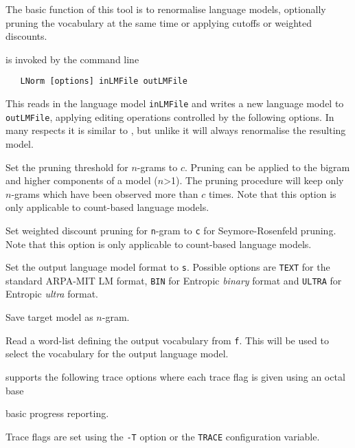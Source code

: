 %
%

\newpage
{}


The basic function of this tool is to renormalise language models,
optionally pruning the vocabulary at the same time or applying cutoffs
or weighted discounts.


 is invoked by the command line
\begin{verbatim}
   LNorm [options] inLMFile outLMFile
\end{verbatim}
This reads in the language model {\tt inLMFile} and writes a new
language model to {\tt outLMFile}, applying editing operations
controlled by the following options.  In many respects it is similar
to , but unlike  it will always
renormalise the resulting model.

\begin{optlist}

   Set the pruning threshold for $n$-grams to $c$. 
	Pruning can be applied to the bigram and higher
	components of a model ($n$>1). The pruning procedure will keep only 
	$n$-grams which have been observed more than $c$ times. Note
	that this option is only applicable to count-based language 
        models.

    Set weighted discount pruning for \texttt{n}-gram
        to \texttt{c} for Seymore-Rosenfeld pruning. Note that this
        option is only applicable to count-based language models.
  
   Set the output language model format to {\tt s}.
        Possible options are {\tt TEXT} for the standard ARPA-MIT
	LM format, {\tt BIN} for Entropic {\em binary} format and 
        {\tt ULTRA} for Entropic {\em ultra} format.
        
   Save target model as $n$-gram.

   Read a word-list defining the output vocabulary from
	{\tt f}. This will be used to select the vocabulary for 
	the output language model.

\end{optlist}


 supports the following trace options where each
trace flag is given using an octal base
\begin{optlist}
    basic progress reporting.
\end{optlist}
Trace flags are set using the \texttt{-T} option or the  \texttt{TRACE} 
configuration variable.
